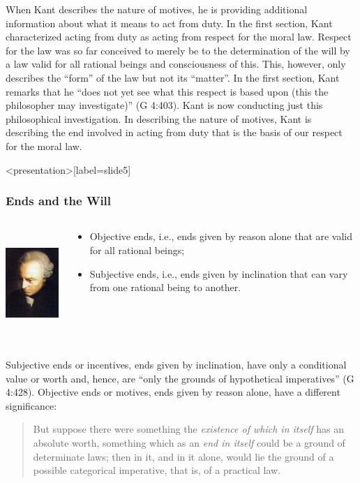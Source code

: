 When Kant describes the nature of motives, he is providing additional information about what it means to act from duty. In the first section, Kant characterized acting from duty as acting from respect for the moral law. Respect for the law was so far conceived to merely be to the determination of the will by a law valid for all rational beings and consciousness of this. This, however, only describes the ``form'' of the law but not its ``matter''. In the first section, Kant remarks that he ``does not yet see what this respect is based upon (this the philosopher may investigate)'' (G 4:403). Kant is now conducting just this philosophical investigation. In describing the nature of motives, Kant is describing the end involved in acting from duty that is the basis of our respect for the moral law. \change

\begin{frame}<presentation>[label=slide5]
    \frametitle{Ends and the Will}
        \begin{columns}
            \begin{column}{3cm}
                \includegraphics[height=4cm]{../../../graphics/kant.jpg}
            \end{column}
            \begin{column}{7cm}
                \begin{itemize}
                    \item \alert{Objective ends}, i.e., ends given by reason alone that are valid for all rational beings;
                    \item \alert{Subjective ends}, i.e., ends given by inclination that can vary from one rational being to another.
                \end{itemize}
            \end{column}
        \end{columns}
\end{frame}

Subjective ends or incentives, ends given by inclination, have only a conditional value or worth and, hence, are ``only the grounds of hypothetical imperatives'' (G 4:428). Objective ends or motives, ends given by reason alone, have a different significance:
\begin{quote}
But suppose there were something the \emph{existence of which in itself} has an absolute worth, something which as an \emph{end in itself} could be a ground of determinate laws; then in it, and in it alone, would lie the ground of a possible categorical imperative, that is, of a practical law.
\end{quote}

